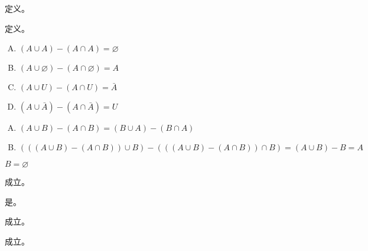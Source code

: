 {{        %
        \begin{practices}
            定义。
        \end{practices}

        \begin{practices}
            定义。
        \end{practices}

        \begin{practices}
            \begin{enumerate}[A.]
                \item $(A \cup A) - (A \cap A) = \varnothing$
                \item $(A \cup \varnothing) - (A \cap \varnothing) = A$
                \item $(A \cup U) - (A \cap U) = \bar{A}$
                \item $(A \cup \bar{A}) - (A \cap \bar{A}) = U$
            \end{enumerate}
        \end{practices}

        \begin{practices}
            \begin{enumerate}[A.]
                \item $(A \cup B) - (A \cap B) = (B \cup A) - (B \cap A)$
                \item $(((A \cup B) - (A \cap B)) \cup B) - (((A \cup B) - (A \cap B)) \cap B) = (A \cup B) - B = A$
            \end{enumerate}
        \end{practices}

        \begin{practices}
            $B = \varnothing$
        \end{practices}

        \begin{practices}
            成立。
        \end{practices}

        \begin{practices}
            是。
        \end{practices}

        \begin{practices}
            成立。
        \end{practices}

        \begin{practices}
            成立。
        \end{practices}

}}
